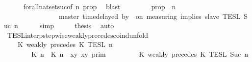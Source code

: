 \begin{isabellebody}
\ \ \ \ \isamarkupfalse%
\ forall{\isacharunderscore}nat{\isacharunderscore}set{\isacharunderscore}suc{\isacharbrackleft}of\ {\isacartoucheopen}n{\isacartoucheclose}\ {\isacharquery}prop{\isacharbrackright}\ \isamarkupfalse%
\ blast\isanewline
\ \ \isamarkupfalse%
\ \isamarkupfalse%
\ {\isacartoucheopen}{\isachardot}{\isachardot}{\isachardot}\ {\isacharequal}\ {\isacharbraceleft}{\isasymrho}{\isachardot}\ {\isacharquery}prop\ {\isasymrho}\ n{\isacharbraceright}\isanewline
\ \ \ \ \ \ \ \ \ \ \ \ \ \ {\isasyminter}\ {\isasymlbrakk}\ master\ time{\isacharminus}delayed\ by\ {\isasymdelta}{\isasymtau}\ on\ measuring\ implies\ slave\ {\isasymrbrakk}\isactrlsub T\isactrlsub E\isactrlsub S\isactrlsub L\isactrlbsup {\isasymge}\ Suc\ n\isactrlesup {\isacartoucheclose}\isanewline
\ \ \ \ \isamarkupfalse%
\ simp\isanewline
\ \ \isamarkupfalse%
\ \isamarkupfalse%
\ {\isacharquery}thesis\ \isamarkupfalse%
\ auto\isanewline
{}\isamarkupfalse%
%
\endisatagproof
{\isafoldproof}%
%
\isadelimproof
\isanewline
%
\endisadelimproof
\isanewline
{}\isamarkupfalse%
\ TESL{\isacharunderscore}interp{\isacharunderscore}stepwise{\isacharunderscore}weakly{\isacharunderscore}precedes{\isacharunderscore}coind{\isacharunderscore}unfold{\isacharcolon}\isanewline
\ \ \ {\isacartoucheopen}{\isasymlbrakk}\ K\ weakly\ precedes\ K\ {\isasymrbrakk}\isactrlsub T\isactrlsub E\isactrlsub S\isactrlsub L\isactrlbsup {\isasymge}\ n\isactrlesup \ {\isacharequal}\ \ \ \ \ \ \ \ \ \ \ \ \ \ \ \ \ %
\isanewline
\ \ \ \ \ \ {\isasymlbrakk}\ {\isacharparenleft}{\isasymlceil}{\isacharhash}\isactrlsup {\isasymle}\ K\ n{\isacharcomma}\ {\isacharhash}\isactrlsup {\isasymle}\ K\ n{\isasymrceil}\ {\isasymin}\ {\isacharparenleft}{\isasymlambda}{\isacharparenleft}x{\isacharcomma}y{\isacharparenright}{\isachardot}\ x{\isasymle}y{\isacharparenright}{\isacharparenright}\ {\isasymrbrakk}\isactrlsub p\isactrlsub r\isactrlsub i\isactrlsub m\ \isanewline
\ \ \ \ \ \ {\isasyminter}\ {\isasymlbrakk}\ K\ weakly\ precedes\ K\ {\isasymrbrakk}\isactrlsub T\isactrlsub E\isactrlsub S\isactrlsub L\isactrlbsup {\isasymge}\ Suc\ n\isactrlesup {\isacartoucheclose}\isanewline
%
\isadelimproof
%
\endisadelimproof
%
\isatagproof
{}\isamarkupfalse%

\end{isabellebody}
